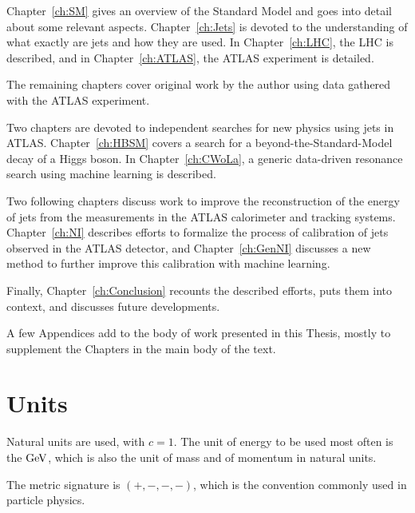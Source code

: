 Chapter~\ref{ch:SM} gives an overview of the Standard Model and goes into detail about some relevant aspects.
Chapter~\ref{ch:Jets} is devoted to the understanding of what exactly are jets and how they are used.
In Chapter~\ref{ch:LHC}, the LHC is described, and in Chapter~\ref{ch:ATLAS}, the ATLAS experiment is detailed.

The remaining chapters cover original work by the author using data gathered with the ATLAS experiment.

Two chapters are devoted to independent searches for new physics using jets in ATLAS.
Chapter~\ref{ch:HBSM} covers a search for a beyond-the-Standard-Model decay of a Higgs boson.
In Chapter~\ref{ch:CWoLa}, a generic data-driven resonance search using machine learning is described.

Two following chapters discuss work to improve the reconstruction of the energy of jets from the measurements in the ATLAS calorimeter and tracking systems.
Chapter~\ref{ch:NI} describes efforts to formalize the process of calibration of jets observed in the ATLAS detector, and Chapter~\ref{ch:GenNI} discusses a new method to further improve this calibration with machine learning.

Finally, Chapter~\ref{ch:Conclusion} recounts the described efforts, puts them into context, and discusses future developments.

A few Appendices add to the body of work presented in this Thesis, mostly to supplement the Chapters in the main body of the text.

\section{Units}
Natural units are used, with $c=1$.
The unit of energy to be used most often is the $\mathrm{GeV}$, which is also the unit of mass and of momentum in natural units.

The metric signature is $(+,-,-,-)$, which is the convention commonly used in particle physics.

